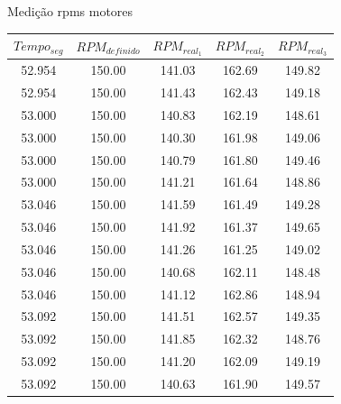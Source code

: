 \begin{quadro}[htb]
	\caption{\label{medicao_motores}Medição rpms motores}
	 \begin{tabular}{|c|c|c|c|c|}
		\hline
		\textbf{$Tempo_{seg}$} & \textbf{$RPM_{definido}$} & \textbf{$RPM_{real_{1}}$} & \textbf{$RPM_{real_{2}}$} & \textbf{$RPM_{real_{3}}$} \\ \hline
		52.954 & 150.00  & 141.03 & 162.69 & 149.82 \\ \hline
		52.954 & 150.00  & 141.43 & 162.43 & 149.18 \\ \hline
		53.000 & 150.00  & 140.83 & 162.19 & 148.61 \\ \hline
		53.000 & 150.00  & 140.30 & 161.98 & 149.06 \\ \hline
		53.000 & 150.00  & 140.79 & 161.80 & 149.46 \\ \hline
		53.000 & 150.00  & 141.21 & 161.64 & 148.86 \\ \hline
		53.046 & 150.00  & 141.59 & 161.49 & 149.28 \\ \hline
		53.046 & 150.00  & 141.92 & 161.37 & 149.65 \\ \hline
		53.046 & 150.00  & 141.26 & 161.25 & 149.02 \\ \hline
		53.046 & 150.00  & 140.68 & 162.11 & 148.48 \\ \hline
		53.046 & 150.00  & 141.12 & 162.86 & 148.94 \\ \hline
		53.092 & 150.00  & 141.51 & 162.57 & 149.35 \\ \hline
		53.092 & 150.00  & 141.85 & 162.32 & 148.76 \\ \hline
		53.092 & 150.00  & 141.20 & 162.09 & 149.19 \\ \hline
		53.092 & 150.00  & 140.63 & 161.90 & 149.57 \\ \hline
	\end{tabular}
\end{quadro}






